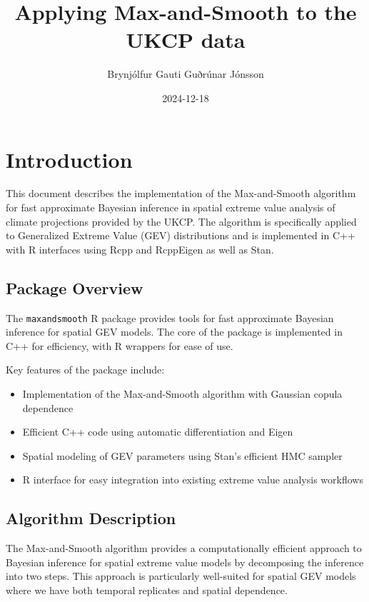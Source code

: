 \documentclass[
  letterpaper,
  DIV=11,
  numbers=noendperiod]{scrartcl}
\title{Applying Max-and-Smooth to the UKCP data}
\author{Brynjólfur Gauti Guðrúnar Jónsson}
\date{2024-12-18}
\providecommand{\tightlist}{%
  \setlength{\itemsep}{0pt}\setlength{\parskip}{0pt}}\usepackage{longtable,booktabs,array}
\begin{document}
\maketitle


\section{Introduction}\label{introduction}

This document describes the implementation of the Max-and-Smooth
algorithm for fast approximate Bayesian inference in spatial extreme
value analysis of climate projections provided by the UKCP. The
algorithm is specifically applied to Generalized Extreme Value (GEV)
distributions and is implemented in C++ with R interfaces using Rcpp and
RcppEigen as well as Stan.

\subsection{Package Overview}\label{package-overview}

The \texttt{maxandsmooth} R package provides tools for fast approximate
Bayesian inference for spatial GEV models. The core of the package is
implemented in C++ for efficiency, with R wrappers for ease of use.

Key features of the package include:

\begin{itemize}
\tightlist
\item
  Implementation of the Max-and-Smooth algorithm with Gaussian copula
  dependence
\item
  Efficient C++ code using automatic differentiation and Eigen
\item
  Spatial modeling of GEV parameters using Stan's efficient HMC sampler
\item
  R interface for easy integration into existing extreme value analysis
  workflows
\end{itemize}

\subsection{Algorithm Description}\label{algorithm-description}

The Max-and-Smooth algorithm provides a computationally efficient
approach to Bayesian inference for spatial extreme value models by
decomposing the inference into two steps. This approach is particularly
well-suited for spatial GEV models where we have both temporal
replicates and spatial dependence.
\end{document}
